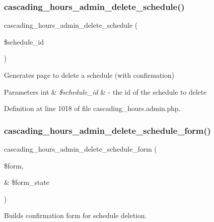 \subsubsection{\texorpdfstring{cascading\+\_\+hours\+\_\+admin\+\_\+delete\+\_\+schedule()}{cascading\_hours\_admin\_delete\_schedule()}}
{\footnotesize\ttfamily cascading\+\_\+hours\+\_\+admin\+\_\+delete\+\_\+schedule (\begin{DoxyParamCaption}\item[{}]{\$schedule\+\_\+id }\end{DoxyParamCaption})}



Generates page to delete a schedule (with confirmation) 


\begin{DoxyParams}[1]{Parameters}
int & {\em \$schedule\+\_\+id} & -\/ the id of the schedule to delete \\
\hline
\end{DoxyParams}


Definition at line 1018 of file cascading\+\_\+hours.\+admin.\+php.

\mbox{\label{cascading__hours_8admin_8php_a883a2af8b6434faccc0ff58acc372d5a_a883a2af8b6434faccc0ff58acc372d5a}} 
\subsubsection{\texorpdfstring{cascading\+\_\+hours\+\_\+admin\+\_\+delete\+\_\+schedule\+\_\+form()}{cascading\_hours\_admin\_delete\_schedule\_form()}}
{\footnotesize\ttfamily cascading\+\_\+hours\+\_\+admin\+\_\+delete\+\_\+schedule\+\_\+form (\begin{DoxyParamCaption}\item[{}]{\$form,  }\item[{\&}]{\$form\+\_\+state }\end{DoxyParamCaption})}



Builds confirmation form for schedule deletion. 


